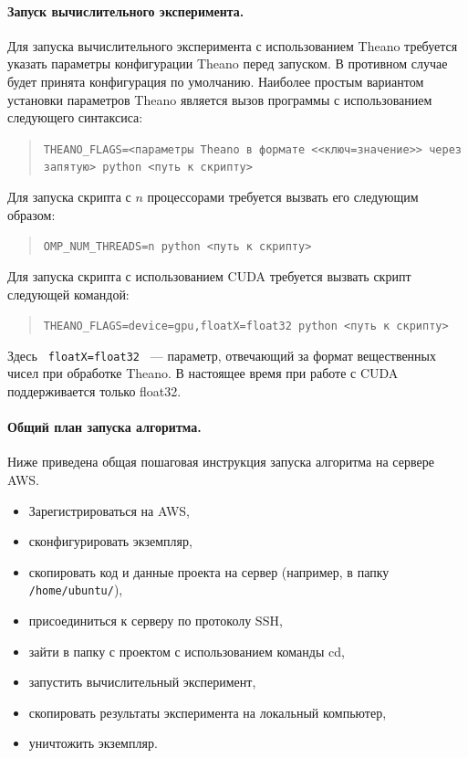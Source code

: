 \documentclass[12pt,notitlepage]{article}
\begin{document}
\paragraph{Запуск вычислительного эксперимента.}
Для запуска вычислительного эксперимента с использованием Theano требуется указать параметры конфигурации Theano перед запуском. В противном случае будет принята конфигурация по умолчанию. Наиболее простым вариантом установки параметров Theano является вызов программы с использованием следующего синтаксиса:
\begin{quote}
\texttt{THEANO\_FLAGS=<параметры Theano в формате <<ключ=значение>> через запятую> python <путь к скрипту>}
\end{quote}

Для запуска скрипта с $n$ процессорами требуется вызвать его следующим образом:
\begin{quote}
\texttt{OMP\_NUM\_THREADS=n python <путь к скрипту>}
\end{quote}

Для запуска скрипта с использованием CUDA требуется вызвать скрипт следующей командой:
\begin{quote}
\texttt{THEANO\_FLAGS=device=gpu,floatX=float32 python <путь к скрипту> }
\end{quote}
Здесь \texttt{ floatX=float32 } --- параметр, отвечающий за формат вещественных чисел при обработке Theano. В настоящее время при работе с CUDA поддерживается только float32. 

\paragraph{Общий план запуска алгоритма.}
Ниже приведена общая пошаговая инструкция запуска алгоритма на сервере AWS.

\begin{itemize}
\item Зарегистрироваться на AWS,
\item сконфигурировать экземпляр,
\item скопировать код и данные проекта на сервер (например, в папку \texttt{/home/ubuntu/}),
\item присоединиться к серверу по протоколу SSH,
\item зайти в папку с проектом с использованием команды cd,
\item запустить вычислительный эксперимент,
\item скопировать результаты эксперимента на локальный компьютер,
\item уничтожить экземпляр.
\end{itemize}
\end{document}
